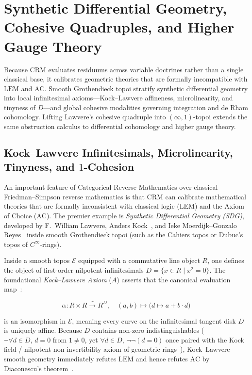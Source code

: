 \documentclass[10pt,twoside,openright]{book}
\theoremstyle{crmplain}
\theoremstyle{crmdef}
\theoremstyle{crmremark}
\begin{document}
\section{Synthetic Differential Geometry, Cohesive Quadruples, and Higher Gauge Theory}\label{sec:cohesive-lattice}

Because $\mathrm{CRM}$ evaluates residuums across variable doctrines rather than a single classical base, it calibrates geometric theories that are formally incompatible with $\mathrm{LEM}$ and $\mathrm{AC}$. Smooth Grothendieck topoi stratify synthetic differential geometry into local infinitesimal axioms---Kock--Lawvere affineness, microlinearity, and tinyness of $D$---and global cohesive modalities governing integration and de Rham cohomology. Lifting Lawvere's cohesive quadruple into $(\infty, 1)$-topoi extends the same obstruction calculus to differential cohomology and higher gauge theory.

\subsection{Kock--Lawvere Infinitesimals, Microlinearity, Tinyness, and $1$-Cohesion}

An important feature of Categorical Reverse Mathematics over classical Friedman--Simpson reverse mathematics is that $\mathrm{CRM}$ can calibrate mathematical theories that are formally inconsistent with classical logic ($\mathrm{LEM}$) and the Axiom of Choice ($\mathrm{AC}$). The premier example is \emph{Synthetic Differential Geometry (SDG)}, developed by F.~William Lawvere, Anders Kock~\cite{Kock06}, and Ieke Moerdijk--Gonzalo Reyes~\cite{MoerdijkReyes91} inside smooth Grothendieck topoi (such as the Cahiers topos or Dubuc's topos of $C^\infty$-rings).

Inside a smooth topos $\mathcal{E}$ equipped with a commutative line object $R$, one defines the object of first-order nilpotent infinitesimals $D = \{x \in R \mid x^2 = 0\}$. The foundational \emph{Kock--Lawvere Axiom} ($A$) asserts that the canonical evaluation map~\cite{Kock06,MoerdijkReyes91}:

\[
  \alpha: R \times R \xrightarrow{\sim} R^D, \quad (a, b) \mapsto \bigl(d \mapsto a + b \cdot d\bigr)
\]

is an isomorphism in $\mathcal{E}$, meaning every curve on the infinitesimal tangent disk $D$ is uniquely affine. Because $D$ contains non-zero indistinguishables ($\neg\forall d \in D,\, d = 0$ from $1 \neq 0$, yet $\forall d \in D,\, \neg\neg(d = 0)$ once paired with the Kock field / nilpotent non-invertibility axiom of geometric rings~\cite[Ch.~I, \S\S I.1--I.2]{Kock06}), Kock--Lawvere smooth geometry immediately refutes $\mathrm{LEM}$ and hence refutes $\mathrm{AC}$ by Diaconescu's theorem~\cite{Diaconescu75}.
\end{document}
